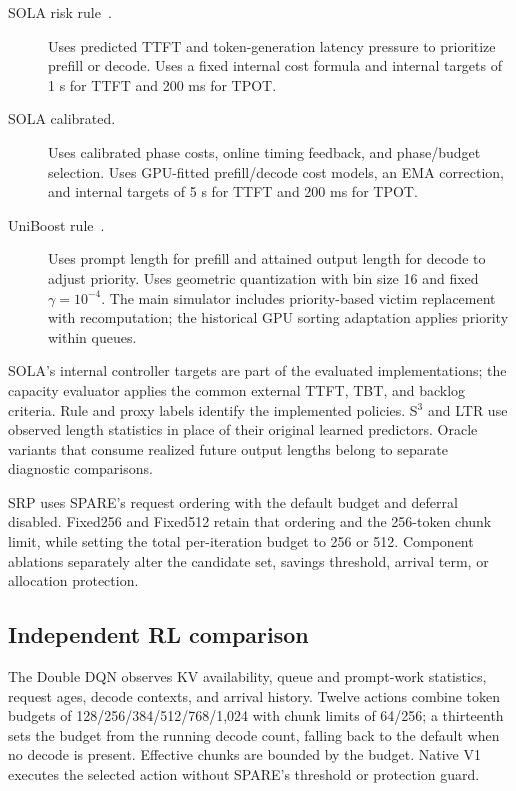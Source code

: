 \begin{description}
\item[SOLA risk rule~\cite{intro_sola}.] Uses predicted TTFT and token-generation latency pressure to prioritize prefill or decode.
Uses a fixed internal cost formula and internal targets of 1 s for TTFT and 200 ms for TPOT.

\item[SOLA calibrated.] Uses calibrated phase costs, online timing feedback, and phase/budget selection.
Uses GPU-fitted prefill/decode cost models, an EMA correction, and internal targets of 5 s for TTFT and 200 ms for TPOT.

\item[UniBoost rule~\cite{intro_uniboost}.] Uses prompt length for prefill and attained output length for decode to adjust priority.
Uses geometric quantization with bin size 16 and fixed $\gamma=10^{-4}$. The main simulator includes priority-based victim replacement with recomputation; the historical GPU sorting adaptation applies priority within queues.

\end{description}

SOLA's internal controller targets are part of the evaluated implementations; the capacity evaluator applies the common external TTFT, TBT, and backlog criteria. Rule and proxy labels identify the implemented policies. S$^3$ and LTR use observed length statistics in place of their original learned predictors. Oracle variants that consume realized future output lengths belong to separate diagnostic comparisons.

SRP uses SPARE's request ordering with the default budget and deferral disabled. Fixed256 and Fixed512 retain that ordering and the 256-token chunk limit, while setting the total per-iteration budget to 256 or 512. Component ablations separately alter the candidate set, savings threshold, arrival term, or allocation protection.

\subsection{Independent RL comparison}
\label{app:experimental-rl}

The Double DQN observes KV availability, queue and prompt-work statistics, request ages, decode contexts, and arrival history. Twelve actions combine token budgets of 128/256/384/512/768/1,024 with chunk limits of 64/256; a thirteenth sets the budget from the running decode count, falling back to the default when no decode is present. Effective chunks are bounded by the budget. Native V1 executes the selected action without SPARE's threshold or protection guard.

